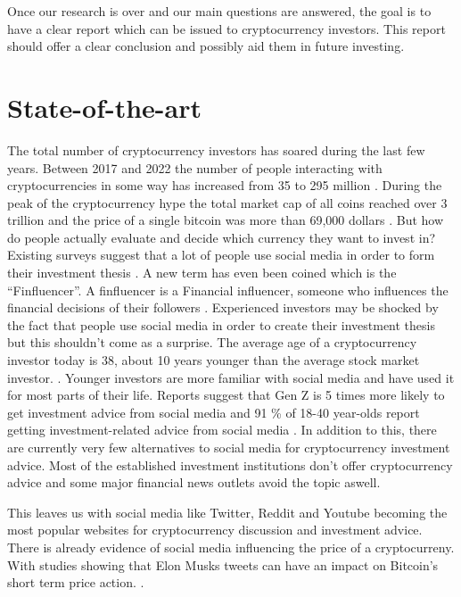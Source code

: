 \noindent Once our research is over and our main questions are answered, the goal is to have a clear report which can be issued to cryptocurrency investors. This report should offer a clear conclusion and possibly aid them in future investing. 



\section{State-of-the-art}%
\label{sec:state-of-the-art}

\noindent The total number of cryptocurrency investors has soared during the last few years. Between 2017 and 2022 the number of people interacting with cryptocurrencies in some way has increased from 35 to 295 million \autocite{Statista2022}. During the peak of the cryptocurrency hype the total market cap of all coins reached over 3 trillion and the price of a single bitcoin was more than 69,000 dollars \autocite{CoinGecko2022}.  But how do people actually evaluate and decide which currency they want to invest in? Existing surveys suggest that a lot of people use social media in order to form their investment thesis \autocite{Magnusson2022}. A new term has even been coined which is the ``Finfluencer''. A finfluencer is a Financial influencer, someone who influences the financial decisions of their followers \autocite{CambridgeWords2021}. Experienced investors may be shocked by the fact that people use social media in order to create their investment thesis but this shouldn't come as a surprise. The average age of a cryptocurrency investor today is 38, about 10 years younger than the average stock market investor. \autocite{Iacurci2021}. Younger investors are more familiar with social media and have used it for most parts of their life. Reports suggest that Gen Z is 5 times more likely to get investment advice from social media and 91 \% of 18-40 year-olds report getting investment-related advice from social media \autocite{Purnell2022}. In addition to this, there are currently very few alternatives to social media for cryptocurrency investment advice. Most of the established investment institutions don't offer cryptocurrency advice and some major financial news outlets avoid the topic aswell.


\noindent This leaves us with social media like Twitter, Reddit and Youtube becoming the most popular websites for cryptocurrency discussion and investment advice. There is already evidence of social media influencing the price of a cryptocurreny. With studies showing that Elon Musks tweets can have an impact on Bitcoin's short term price action. \autocite{Huynh2022}.


